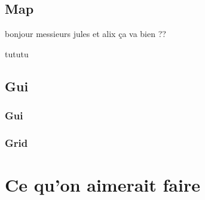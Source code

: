 \documentclass{article}
\begin{document}
\subsection{Map}
bonjour
messieurs jules et alix ça va bien ??

tututu
\subsection{Gui}
\subsubsection{Gui}
\subsubsection{Grid}

\section{Ce qu'on aimerait faire}
\end{document}
